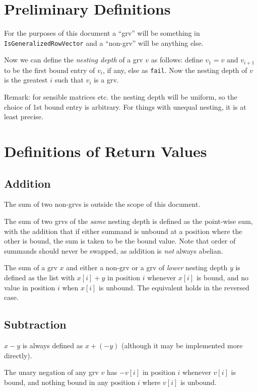 \documentclass{article}
\begin{document}
\section{Preliminary Definitions}



For the purposes of this document a ``grv'' will be something in
\verb|IsGeneralizedRowVector| and a ``non-grv'' will be anything else.

Now we can define the \emph{nesting depth} of a grv $v$ as
follows: define $v_1 = v$ and $v_{i+1}$ to be the first bound entry of
$v_i$, if any, else as \verb|fail|. Now the nesting depth of $v$ is
the greatest $i$ such that $v_i$ is a grv.

Remark: for sensible matrices etc. the nesting depth will be uniform,
so the choice of 1st bound entry is arbitrary. For things with unequal
nesting, it is at least precise.



\section{Definitions of Return Values}

\subsection{Addition}

The sum of two non-grvs is outside the scope of this document.

The sum of two grvs of the \emph{same} nesting depth is defined as the
point-wise sum, with the addition that if either summand is unbound at 
a position where the other is bound, the sum is taken to be the bound
value. Note that order of summands should never be swapped, as
addition is \emph{not} always abelian.

The sum of a grv $x$ and either a non-grv or a grv of \emph{lower}
nesting depth $y$ is defined as the list with $x[i] + y$ in position
$i$ whenever $x[i]$ is bound, and no value in position $i$ when $x[i]$
is unbound. The equivalent holds in the reversed case.

\subsection{Subtraction}

$x-y$ is always defined as $x+(-y)$ (although it may be implemented
more directly).

The unary negation of any grv $v$ has $-v[i]$ in position $i$ whenever
$v[i]$ is bound, and nothing bound in any position $i$ where $v[i]$ is 
unbound.
\end{document}
